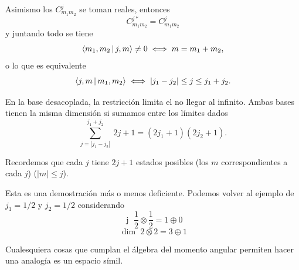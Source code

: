 \documentclass[10pt,oneside]{CBFT_book}
\begin{document}
Asimismo los $C_{m_1 m_2}^j$ se toman reales, entonces 
\[
	C_{m_1m_2}^{j*} = C_{m_1m_2}^{j}
\]
y juntando todo se tiene 
\[
	\Braket{m_1,m_2|j,m} \neq 0	\iff  m = m_1 + m_2,
\]
o lo que es equivalente
\[
	\Braket{j,m|m_1,m_2} \iff |j_1 - j_2| \leq j \leq j_1 + j_2.
\]

En la base desacoplada, la restricción limita el no llegar al infinito.
Ambas bases tienen la misma dimensión si sumamos entre los límites dados
\[
	\sum_{j=|j_1-j_2|}^{ j_1 + j_2 } \: 2j+1 = (2j_1 + 1)(2j_2 + 1).
\]

Recordemos que cada $j$ tiene $2j+1$ estados posibles (los $m$ correspondientes a 
cada $j$) ($|m|\leq j$). 

Esta es una demostración más o menos deficiente. Podemos volver al ejemplo de 
$j_1 = 1/2$ y $j_2=1/2$ considerando
\[
	\text{ j } \; \frac{1}{2} \otimes \frac{1}{2} = 1 \oplus 0 
\]
\[
	\text{ dim } \; {2} \otimes {2} = 3 \oplus 1
\]

Cualesquiera cosas que cumplan el álgebra del momento angular permiten hacer una
analogía es un espacio símil.
\end{document}
